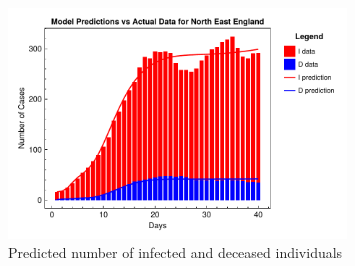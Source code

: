 \documentclass[12pt]{article}
\begin{document}
\begin{figure}
    \centering
    \includegraphics[width=0.8\textwidth]{images/ude/North East England_infected_death_data.pdf}
    \caption{Predicted number of infected and deceased individuals}
    \label{fig:ude_North East England}
\end{figure}
\end{document}
